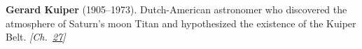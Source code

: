 \textbf{Gerard Kuiper} (1905–1973). Dutch-American astronomer who discovered the atmosphere of Saturn's moon Titan and hypothesized the existence of the Kuiper Belt. \emph{[Ch.~\hyperref[ch:planetaryskycolors]{27}]}

